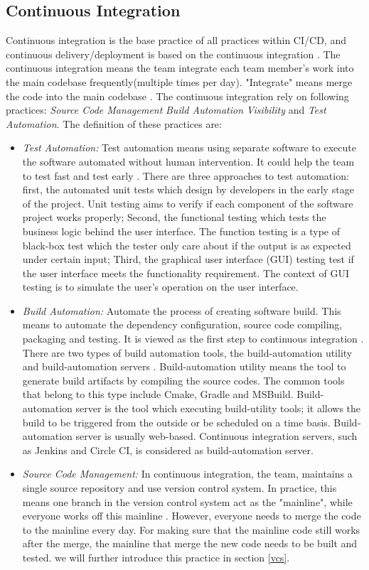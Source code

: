 \subsection{Continuous Integration}
Continuous integration is the base practice of all practices within CI/CD, and continuous delivery/deployment is based on the continuous integration \cite{pittet2018continuous}.
The continuous integration means the team integrate each team member's work into the main codebase frequently(multiple times per day). "Integrate" means merge the code into the main codebase \cite{fowler2006continuous}. The continuous integration rely on following practices: \textit{Source Code Management} \textit{Build Automation} \textit{Visibility} and \textit{Test Automation}. The definition of these practices are:
\begin{itemize}
    \label{TestA}
    \item \textit{Test Automation:} Test automation means using separate software to execute the software automated without human intervention. It could help the team to test fast and test early \cite{Testauto48:online}. There are three approaches to test automation: first, the automated unit tests which design by developers in the early stage of the project. Unit testing aims to verify if each component of the software project works properly; Second, the functional testing which tests the business logic behind the user interface. The function testing is a type of black-box test which the tester only care about if the output is as expected under certain input; Third, the graphical user interface (GUI) testing test if the user interface meets the functionality requirement. The context of GUI testing is to simulate the user's operation on the user interface.
    \item \textit{Build Automation:} Automate the process of creating software build. This means to automate the dependency configuration, source code compiling, packaging and testing. It is viewed as the first step to continuous integration \cite{Buildaut62:online}. There are two types of build automation tools, the build-automation utility and build-automation servers \cite{ceruzzi2003history}. Build-automation utility means the tool to generate build artifacts by compiling the source codes. The common tools that belong to this type include Cmake, Gradle and MSBuild. Build-automation server is the tool which executing build-utility tools; it allows the build to be triggered from the outside or be scheduled on a time basis. Build-automation server is usually web-based. Continuous integration servers, such as Jenkins and Circle CI, is considered as build-automation server. 
    \item \textit{Source Code Management:} In continuous integration, the team, maintains a single source repository and use version control system. In practice, this means one branch in the version control system act as the "mainline", while everyone works off this mainline \cite{fowler2006continuous}. However, everyone needs to merge the code to the mainline every day. For making sure that the mainline code still works after the merge, the mainline that merge the new code needs to be built and tested. we will further introduce this practice in section \ref{vcs}. 
\end{itemize}
